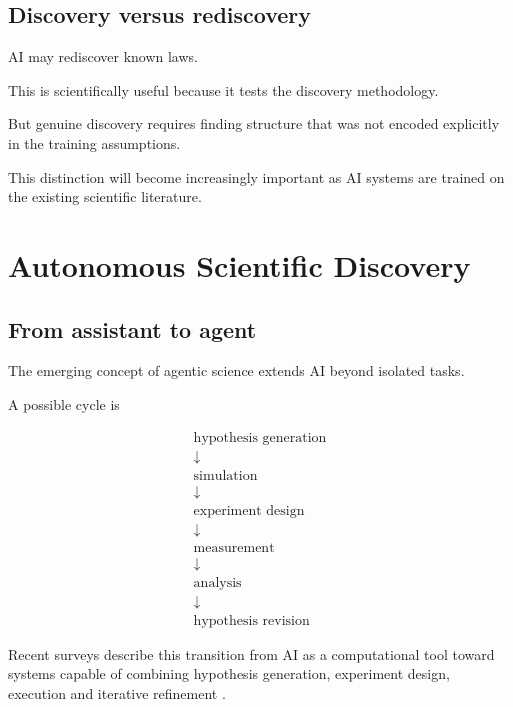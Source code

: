 \documentclass[11pt,a4paper,oneside]{book}
\begin{document}
\section{Discovery versus rediscovery}

AI may rediscover known laws.

This is scientifically useful because it tests the discovery methodology.

But genuine discovery requires finding structure that was not encoded explicitly
in the training assumptions.

This distinction will become increasingly important as AI systems are trained
on the existing scientific literature.

\chapter{Autonomous Scientific Discovery}

\section{From assistant to agent}

The emerging concept of agentic science extends AI beyond isolated tasks.

A possible cycle is

\begin{equation}
\boxed{
\begin{array}{c}
\text{hypothesis generation}\\
\downarrow\\
\text{simulation}\\
\downarrow\\
\text{experiment design}\\
\downarrow\\
\text{measurement}\\
\downarrow\\
\text{analysis}\\
\downarrow\\
\text{hypothesis revision}
\end{array}}
\end{equation}

Recent surveys describe this transition from AI as a computational tool toward
systems capable of combining hypothesis generation, experiment design,
execution and iterative refinement \citep{Wei2025}.
\end{document}
